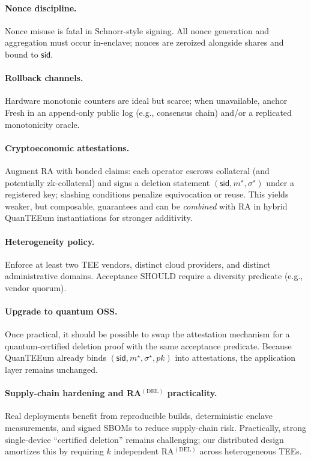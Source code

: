 \documentclass[runningheads,orivec]{llncs}
\newcommand{\prot}{\textsf{QuanTEEum}}
\newcommand{\sid}{\mathsf{sid}}
\begin{document}
\paragraph{Nonce discipline.}
Nonce misuse is fatal in Schnorr\mbox{-}style signing. All nonce generation and aggregation must occur in\mbox{-}enclave; nonces are zeroized alongside shares and bound to $\sid$.

\paragraph{Rollback channels.}
Hardware monotonic counters are ideal but scarce; when unavailable, anchor \textsf{Fresh} in an append-only public log (e.g., consensus chain) and/or a replicated monotonicity oracle.

\paragraph{Cryptoeconomic attestations.}
Augment RA with bonded claims: each operator escrows collateral (and potentially zk-collateral) and signs a deletion statement $(\sid,m^{\star},\sigma^{\star})$ under a registered key; slashing conditions penalize equivocation or reuse. This yields weaker, but composable, guarantees and can be \emph{combined} with RA in hybrid QuanTEEum instantiations for stronger additivity.

\paragraph{Heterogeneity policy.}
Enforce at least two TEE vendors, distinct cloud providers, and distinct administrative domains. Acceptance SHOULD require a diversity predicate (e.g., vendor quorum).

\paragraph{Upgrade to quantum OSS.}
Once practical, it should be possible to swap the attestation mechanism for a quantum-certified deletion proof with the same acceptance predicate. Because \prot{} already binds $(\mathsf{sid},m^{\star},\sigma^{\star},pk)$ into attestations, the application layer remains unchanged.

\paragraph{Supply-chain hardening and RA$^{(\mathrm{DEL})}$ practicality.}
Real deployments benefit from reproducible builds, deterministic enclave measurements, and signed SBOMs to reduce supply-chain risk. Practically, strong single-device “certified deletion” remains challenging; our distributed design amortizes this by requiring $k$ independent RA$^{(\mathrm{DEL})}$ across heterogeneous TEEs. 
\end{document}
